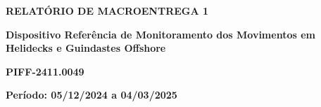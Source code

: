 \begin{center}
    \LARGE
    \textbf{RELATÓRIO DE MACROENTREGA 1}

    \vspace{0.6cm}
    \normalsize

    \begin{minipage}{.90\linewidth}
        \centering
        \textbf{
            Dispositivo Referência de Monitoramento dos Movimentos em Helidecks e Guindastes Offshore
        }

        \vspace{.3cm}
        \textbf{PIFF-2411.0049}
        \normalsize
    \end{minipage}
    
    \vspace{0.3cm}
    
    \begin{flushleft}
     \phantom{a.}\textbf{Período: 05/12/2024 a 04/03/2025}
    \end{flushleft}
    

\end{center}
